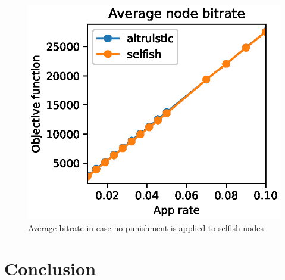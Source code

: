 \documentclass[conference]{IEEEtran}
\begin{document}
\begin{figure}[h]
  \includegraphics{figures/obj_func_vs_app_rate_no_punish.eps}
  \caption{Average bitrate in case no punishment is applied to selfish nodes}
  \label{fig:no-blame-app-rate}
\end{figure}

\section{Conclusion}


% 
\end{document}
